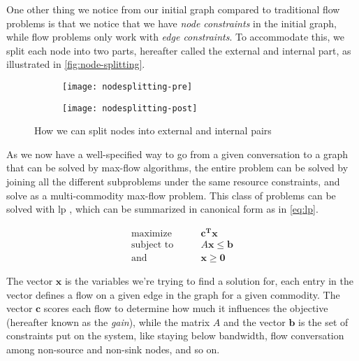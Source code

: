 One other thing we notice from our initial graph compared to traditional flow problems is that we notice that we have \emph{node constraints} in the initial graph, while flow problems only work with \emph{edge constraints}. To accommodate this, we split each node into two parts, hereafter called the external and internal part, as illustrated in \autoref{fig:node-splitting}.

\begin{figure}
    \centering
    \begin{subfigure}[t]{.48\textwidth}
        \centering
        \texttt{[image: nodesplitting-pre]}
    \end{subfigure}
    \hfill
    \begin{subfigure}[t]{.48\textwidth}
        \centering
        \texttt{[image: nodesplitting-post]}
    \end{subfigure}
    \caption{How we can split nodes into external and internal pairs}
    \label{fig:node-splitting}
\end{figure}

As we now have a well-specified way to go from a given conversation to a graph that can be solved by max-flow algorithms, the entire problem can be solved by joining all the different subproblems under the same resource constraints, and solve as a multi-commodity max-flow problem. This class of problems can be solved with \acrfull{lp} \cite{ahuja1988network}, which can be summarized in canonical form as in \autoref{eq:lp}.

\begin{align}\label{eq:lp}
    \text{maximize}\qquad &\mathbf{c^Tx} \\
    \text{subject to}\qquad &A\mathbf{x} \leq \mathbf{b} \nonumber \\
    \text{and}\qquad &\mathbf{x} \geq \mathbf{0} \nonumber
\end{align}

The vector $\mathbf{x}$ is the variables we're trying to find a solution for, each entry in the vector defines a flow on a given edge in the graph for a given commodity. The vector $\mathbf{c}$ scores each flow to determine how much it influences the objective (hereafter known as the \emph{gain}), while the matrix $A$ and the vector $\mathbf{b}$ is the set of constraints put on the system, like staying below bandwidth, flow conversation among non-source and non-sink nodes, and so on.

